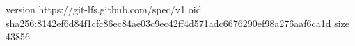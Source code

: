 version https://git-lfs.github.com/spec/v1
oid sha256:8142ef6d84f1cfc86ec84ae03c9ec42ff4d571adc6676290ef98a276aaf6ca1d
size 43856
